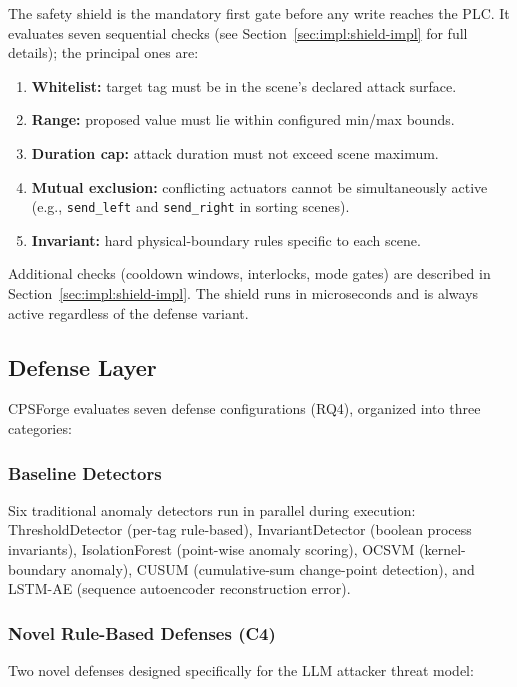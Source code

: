 The safety shield is the mandatory first gate before any write reaches the PLC. It evaluates seven sequential checks (see Section~\ref{sec:impl:shield-impl} for full details); the principal ones are:
\begin{enumerate}[leftmargin=2em,nosep]
    \item \textbf{Whitelist:} target tag must be in the scene's declared attack surface.
    \item \textbf{Range:} proposed value must lie within configured min/max bounds.
    \item \textbf{Duration cap:} attack duration must not exceed scene maximum.
    \item \textbf{Mutual exclusion:} conflicting actuators cannot be simultaneously active (e.g., \texttt{send\_left} and \texttt{send\_right} in sorting scenes).
    \item \textbf{Invariant:} hard physical-boundary rules specific to each scene.
\end{enumerate}

\noindent Additional checks (cooldown windows, interlocks, mode gates) are described in Section~\ref{sec:impl:shield-impl}. The shield runs in microseconds and is always active regardless of the defense variant.

\subsection{Defense Layer}
\label{sec:design:defense}

CPSForge evaluates seven defense configurations (RQ4), organized into three categories:

\subsubsection{Baseline Detectors}
Six traditional anomaly detectors run in parallel during execution: ThresholdDetector (per-tag rule-based), InvariantDetector (boolean process invariants), IsolationForest (point-wise anomaly scoring), OCSVM (kernel-boundary anomaly), CUSUM (cumulative-sum change-point detection), and LSTM-AE (sequence autoencoder reconstruction error).

\subsubsection{Novel Rule-Based Defenses (C4)}
Two novel defenses designed specifically for the LLM attacker threat model:


